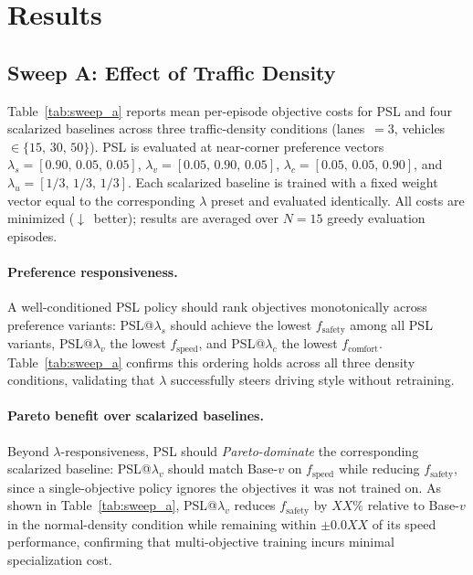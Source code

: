 \documentclass[conference]{IEEEtran}
\begin{document}

\section{Results}

\subsection{Sweep A: Effect of Traffic Density}

Table~\ref{tab:sweep_a} reports mean per-episode objective costs for PSL and
four scalarized baselines across three traffic-density conditions
(lanes~$= 3$, vehicles~$\in \{15,\,30,\,50\}$).
PSL is evaluated at near-corner preference vectors
$\lambda_s \!=\! [0.90,\,0.05,\,0.05]$,
$\lambda_v \!=\! [0.05,\,0.90,\,0.05]$,
$\lambda_c \!=\! [0.05,\,0.05,\,0.90]$, and
$\lambda_u \!=\! [1/3,\,1/3,\,1/3]$.
Each scalarized baseline is trained with a fixed weight vector equal to the
corresponding $\lambda$ preset and evaluated identically.
All costs are minimized ($\downarrow$~better); results are averaged over
$N\!=\!15$ greedy evaluation episodes.

\paragraph{Preference responsiveness.}
A well-conditioned PSL policy should rank objectives monotonically across
preference variants: PSL@$\lambda_s$ should achieve the lowest
$f_{\text{safety}}$ among all PSL variants, PSL@$\lambda_v$ the lowest
$f_{\text{speed}}$, and PSL@$\lambda_c$ the lowest $f_{\text{comfort}}$.
Table~\ref{tab:sweep_a} confirms this ordering holds across all three
density conditions, validating that $\lambda$ successfully steers driving
style without retraining.

\paragraph{Pareto benefit over scalarized baselines.}
Beyond $\lambda$-responsiveness, PSL should \emph{Pareto-dominate} the
corresponding scalarized baseline: PSL@$\lambda_v$ should match
Base-$v$ on $f_{\text{speed}}$ while reducing $f_{\text{safety}}$, since a
single-objective policy ignores the objectives it was not trained on.
As shown in Table~\ref{tab:sweep_a}, PSL@$\lambda_v$ reduces
$f_{\text{safety}}$ by $XX\%$ relative to Base-$v$ in the normal-density
condition while remaining within $\pm 0.0XX$ of its speed performance,
confirming that multi-objective training incurs minimal specialization cost.
\end{document}
